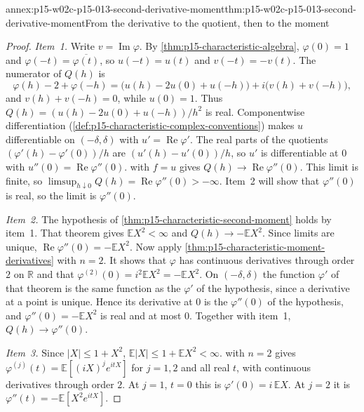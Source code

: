 \begin{annexitem}{annex:p15-w02c-p15-013-second-derivative-moment}{thm:p15-w02c-p15-013-second-derivative-moment}{From the derivative to the quotient, then to the moment}
\begin{proof}
\emph{Item~1.} Write \(v=\operatorname{Im}\varphi\). By
\cref{thm:p15-characteristic-algebra}, \(\varphi(0)=1\) and
\(\varphi(-t)=\overline{\varphi(t)}\), so \(u(-t)=u(t)\) and \(v(-t)=-v(t)\).
The numerator of \(Q(h)\) is
\[
 \varphi(h)-2+\varphi(-h)=\bigl(u(h)-2u(0)+u(-h)\bigr)
     +i\bigl(v(h)+v(-h)\bigr),
\]
and \(v(h)+v(-h)=0\), while \(u(0)=1\). Thus
\(Q(h)=(u(h)-2u(0)+u(-h))/h^2\) is real. Componentwise differentiation
(\cref{def:p15-characteristic-complex-conventions}) makes \(u\) differentiable
on \((-\delta,\delta)\) with \(u'=\operatorname{Re}\varphi'\). The real parts
of the quotients \((\varphi'(h)-\varphi'(0))/h\) are
\((u'(h)-u'(0))/h\), so \(u'\) is differentiable at \(0\) with
\(u''(0)=\operatorname{Re}\varphi''(0)\).
 with \(f=u\) gives
\(Q(h)\to\operatorname{Re}\varphi''(0)\). This limit is finite, so
\(\limsup_{h\downarrow0}Q(h)=\operatorname{Re}\varphi''(0)>-\infty\).
Item~2 will show that \(\varphi''(0)\) is real, so the limit is
\(\varphi''(0)\).

\emph{Item~2.} The hypothesis of \cref{thm:p15-characteristic-second-moment}
holds by item~1. That theorem gives \(\mathbb EX^2<\infty\) and
\(Q(h)\to-\mathbb EX^2\). Since limits are unique,
\(\operatorname{Re}\varphi''(0)=-\mathbb EX^2\). Now apply
\cref{thm:p15-characteristic-moment-derivatives} with \(n=2\). It shows that
\(\varphi\) has continuous derivatives through order \(2\) on \(\mathbb R\)
and that \(\varphi^{(2)}(0)=i^2\mathbb EX^2=-\mathbb EX^2\). On
\((-\delta,\delta)\) the function \(\varphi'\) of that theorem is the same
function as the \(\varphi'\) of the hypothesis, since a derivative at a point
is unique. Hence its derivative at \(0\) is the \(\varphi''(0)\) of the
hypothesis, and \(\varphi''(0)=-\mathbb EX^2\) is real and at most \(0\).
Together with item~1, \(Q(h)\to\varphi''(0)\).

\emph{Item~3.} Since \(|X|\leq1+X^2\), \(\mathbb E|X|\leq1+\mathbb EX^2<\infty\).
 with \(n=2\) gives
\(\varphi^{(j)}(t)=\mathbb E[(iX)^je^{itX}]\) for \(j=1,2\) and all real
\(t\), with continuous derivatives through order \(2\). At \(j=1\), \(t=0\)
this is \(\varphi'(0)=i\,\mathbb EX\). At \(j=2\) it is
\(\varphi''(t)=-\mathbb E[X^2e^{itX}]\).
\end{proof}
\end{annexitem}

